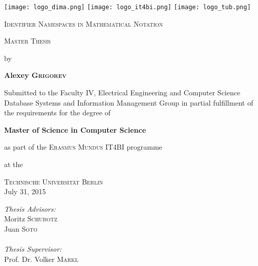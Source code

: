 
\begin{titlepage}
\begin{center}

\texttt{[image: logo\_dima.png]}
\hfill
\texttt{[image: logo\_it4bi.png]}
\hfill
\texttt{[image: logo\_tub.png]}


\vspace*{1.5cm}

\LARGE
\textsc{Identifier Namespaces in Mathematical Notation}

\vspace{1cm}

\Large \textsc{Master Thesis}

\vspace{0.2cm}

by

\vspace{0.4cm}


\textbf{Alexey \textsc{Grigorev}}

\vspace{1.0cm}

\vfill

\large
Submitted to the Faculty IV, Electrical Engineering and Computer Science
Database Systems and Information Management Group
in partial fulfillment of the requirements for the degree of

\textbf{Master of Science in Computer Science}

as part of the \textsc{Erasmus Mundus} IT4BI programme

at the

\textsc{Technische Universit\"{a}t Berlin} \\

July 31, 2015

\vfill

\begin{flushright}
\normalsize
\emph{Thesis Advisors:}\\
Moritz \textsc{Schubotz} \\
Juan \textsc{Soto} \\

\ \\

\emph{Thesis Supervisor:}\\
Prof. Dr. Volker \textsc{Markl}\\
\end{flushright}


\end{center}
\end{titlepage}

